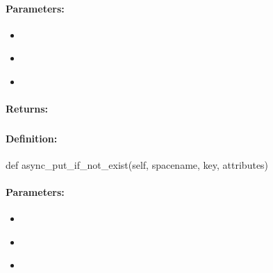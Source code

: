 \paragraph{Parameters:}
\begin{itemize}[noitemsep]
\item {}\\

\item {}\\

\item {}\\

\end{itemize}

\paragraph{Returns:}


\pagebreak
\subsubsection{}
\label{api:python:async_put_if_not_exist}


\paragraph{Definition:}
\begin{pythoncode}
def async_put_if_not_exist(self, spacename, key, attributes)
\end{pythoncode}

\paragraph{Parameters:}
\begin{itemize}[noitemsep]
\item {}\\

\item {}\\

\item {}\\

\end{itemize}

